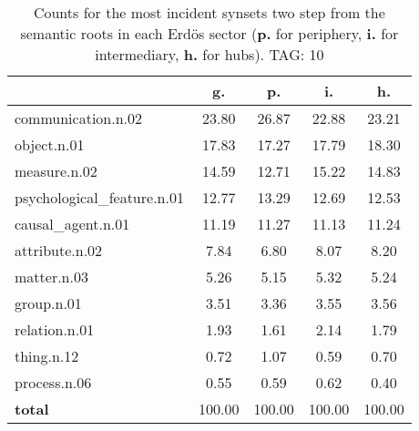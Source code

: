 \begin{table}[h!]
\begin{center}
\begin{tabular}{| l | c | c | c | c |}\hline
 & g. & p. & i. & h. \\\hline
communication.n.02 & 23.80  & 26.87  & 22.88  & 23.21 \\\hline
object.n.01 & 17.83  & 17.27  & 17.79  & 18.30 \\\hline
measure.n.02 & 14.59  & 12.71  & 15.22  & 14.83 \\\hline
psychological\_feature.n.01 & 12.77  & 13.29  & 12.69  & 12.53 \\\hline
causal\_agent.n.01 & 11.19  & 11.27  & 11.13  & 11.24 \\\hline
attribute.n.02 & 7.84  & 6.80  & 8.07  & 8.20 \\\hline
matter.n.03 & 5.26  & 5.15  & 5.32  & 5.24 \\\hline
group.n.01 & 3.51  & 3.36  & 3.55  & 3.56 \\\hline
relation.n.01 & 1.93  & 1.61  & 2.14  & 1.79 \\\hline
thing.n.12 & 0.72  & 1.07  & 0.59  & 0.70 \\\hline
process.n.06 & 0.55  & 0.59  & 0.62  & 0.40 \\\hline
{{\bf total}} & 100.00  & 100.00  & 100.00  & 100.00 \\\hline
\end{tabular}
\caption{Counts for the most incident synsets two step from the semantic roots in each Erd\"os sector ({\bf p.} for periphery, {\bf i.} for intermediary, {\bf h.} for hubs). TAG: 10}
\end{center}
\end{table}